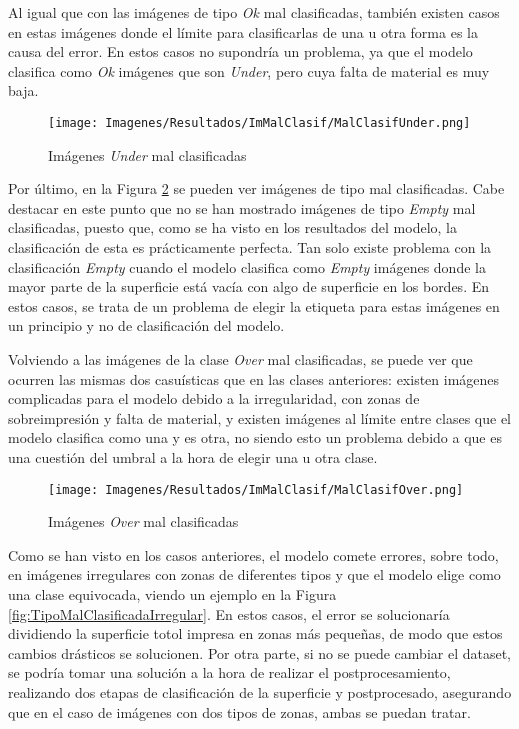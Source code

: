 \documentclass{report}
\begin{document}
Al igual que con las imágenes de tipo \textit{Ok} mal clasificadas, también existen casos en estas imágenes donde el límite para clasificarlas de una u otra forma es la causa del error. En estos casos no supondría un problema, ya que el modelo clasifica como \textit{Ok} imágenes que son \textit{Under}, pero cuya falta de material es muy baja.


\begin{figure}[H]
    \centering
    \texttt{[image: Imagenes/Resultados/ImMalClasif/MalClasifUnder.png]}
    \caption{ Imágenes \textit{Under} mal clasificadas  }
    \label{fig:ImMalClasifUnder}
\end{figure}


Por último, en la Figura \ref{fig:ImMalClasifOver} se pueden ver imágenes de tipo  mal clasificadas. Cabe destacar en este punto que no se han mostrado imágenes de tipo \textit{Empty} mal clasificadas, puesto que, como se ha visto en los resultados del modelo, la clasificación de esta es prácticamente perfecta. Tan solo existe problema con la clasificación \textit{Empty} cuando el modelo clasifica como \textit{Empty} imágenes donde la mayor parte de la superficie está vacía con algo de superficie en los bordes. En estos casos, se trata de un problema de elegir la etiqueta para estas imágenes en un principio y no de clasificación del modelo.

Volviendo a las imágenes de la clase \textit{Over} mal clasificadas, se puede ver que ocurren las mismas dos casuísticas que en las clases anteriores: existen imágenes complicadas para el modelo debido a la irregularidad, con zonas de sobreimpresión y falta de material, y existen imágenes al límite entre clases que el modelo clasifica como una y es otra, no siendo esto un problema debido a que es una cuestión del umbral a la hora de elegir una u otra clase. 

\begin{figure}[H]
    \centering
    \texttt{[image: Imagenes/Resultados/ImMalClasif/MalClasifOver.png]}
    \caption{ Imágenes \textit{Over} mal clasificadas  }
    \label{fig:ImMalClasifOver}
\end{figure}



Como se han visto en los casos anteriores, el modelo comete errores, sobre todo, en imágenes irregulares con zonas de diferentes tipos y que el modelo elige como una clase equivocada, viendo un ejemplo en la Figura \ref{fig:TipoMalClasificadaIrregular}. En estos casos, el error se solucionaría dividiendo la superficie totol impresa en zonas más pequeñas, de modo que estos cambios drásticos se solucionen. Por otra parte, si no se puede cambiar el dataset, se podría tomar una solución a la hora de realizar el postprocesamiento, realizando dos etapas de clasificación de la superficie y postprocesado, asegurando que en el caso de imágenes con dos tipos de zonas, ambas se puedan tratar.
\end{document}
